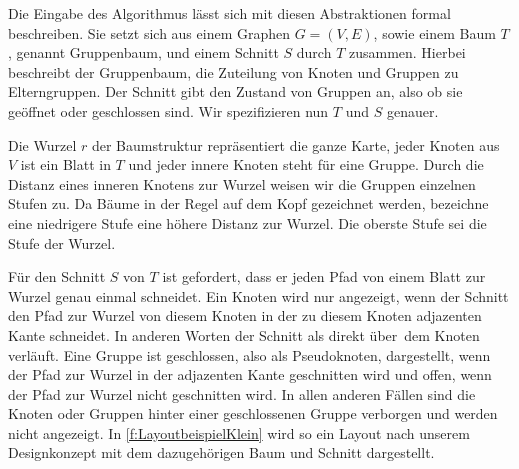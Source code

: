 Die Eingabe des Algorithmus lässt sich mit diesen Abstraktionen formal beschreiben. 
Sie setzt sich aus einem Graphen $G=(V,E)$, sowie einem Baum $T$, genannt Gruppenbaum,  und einem Schnitt $S$ durch $T$ zusammen. 
Hierbei beschreibt der Gruppenbaum, die Zuteilung von Knoten und Gruppen zu Elterngruppen. 
Der Schnitt gibt den Zustand von Gruppen an, also ob sie geöffnet oder geschlossen sind. Wir spezifizieren nun $T$ und $S$ genauer.

Die Wurzel $r$ der Baumstruktur repräsentiert die ganze Karte, jeder Knoten aus $V$ ist ein Blatt in $T$ und jeder innere Knoten steht für eine Gruppe.
Durch die Distanz eines inneren Knotens zur Wurzel weisen wir die Gruppen einzelnen Stufen zu. 
Da Bäume in der Regel auf dem Kopf gezeichnet werden, bezeichne eine niedrigere Stufe eine höhere Distanz zur Wurzel. Die oberste Stufe sei die Stufe der Wurzel.
		
		
Für den Schnitt $S$ von $T$ ist gefordert, dass er jeden Pfad von einem Blatt zur Wurzel genau einmal schneidet.
Ein Knoten wird nur angezeigt, wenn der Schnitt den Pfad zur Wurzel von diesem Knoten in der zu diesem Knoten adjazenten Kante schneidet. 
In anderen Worten der Schnitt als \glqq direkt über\grqq\ dem Knoten verläuft.
Eine Gruppe ist geschlossen, also als Pseudoknoten, dargestellt, wenn der Pfad zur Wurzel in der adjazenten Kante geschnitten wird und offen, wenn der Pfad zur Wurzel nicht geschnitten wird. In allen anderen Fällen sind die Knoten oder Gruppen hinter einer geschlossenen Gruppe verborgen und werden nicht angezeigt.
In \autoref{f:LayoutbeispielKlein} wird so ein Layout nach unserem Designkonzept mit dem dazugehörigen Baum und Schnitt dargestellt.

